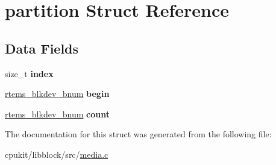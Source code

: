 \hypertarget{structpartition}{}\section{partition Struct Reference}
\label{structpartition}
\subsection*{Data Fields}
\begin{DoxyCompactItemize}
\item 
\mbox{\label{structpartition_aa24ac20485d4571e0360cdc6f42f93f8}} 
size\+\_\+t {\bfseries index}
\item 
\mbox{\label{structpartition_a708f989496f7ebee6a3a19820968734c}} 
\mbox{\hyperlink{group__rtems__disk_ga5fbcfd40b657bff6c54d9e393fab3274}{rtems\+\_\+blkdev\+\_\+bnum}} {\bfseries begin}
\item 
\mbox{\label{structpartition_a4d498d805fa363f36ef833dba4ed5b04}} 
\mbox{\hyperlink{group__rtems__disk_ga5fbcfd40b657bff6c54d9e393fab3274}{rtems\+\_\+blkdev\+\_\+bnum}} {\bfseries count}
\end{DoxyCompactItemize}


The documentation for this struct was generated from the following file\+:\begin{DoxyCompactItemize}
\item 
cpukit/libblock/src/\mbox{\hyperlink{media_8c}{media.\+c}}\end{DoxyCompactItemize}
